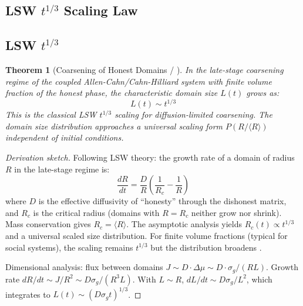 \documentclass[12pt,a4paper]{article}
\theoremstyle{plain}
\newtheorem{theorem}{ Theorem}[section]
\theoremstyle{definition}
\begin{document}
\subsection{LSW $t^{1/3}$ Scaling Law}
\subsection*{LSW $t^{1/3}$ }

\begin{theorem}[Coarsening of Honest Domains / ]
\label{thm:coarsening}
In the late-stage coarsening regime of the coupled Allen-Cahn/Cahn-Hilliard
system with finite volume fraction of the honest phase, the characteristic
domain size $L(t)$ grows as:
\begin{equation}
    L(t) \sim t^{1/3}
    \label{eq:lsw_scaling}
\end{equation}
This is the classical LSW $t^{1/3}$ scaling for diffusion-limited coarsening.
The domain size distribution approaches a universal scaling form
$P(R/\langle R\rangle)$ independent of initial conditions.
\end{theorem}

\begin{proof}[Derivation sketch]
Following LSW theory: the growth rate of a domain of radius $R$ in the
late-stage regime is:
\begin{equation}
    \frac{dR}{dt} = \frac{D}{R}\left(\frac{1}{R_c} - \frac{1}{R}\right)
    \label{eq:lsw_growth}
\end{equation}
where $D$ is the effective diffusivity of ``honesty'' through the dishonest
matrix, and $R_c$ is the critical radius (domains with $R=R_c$ neither
grow nor shrink). Mass conservation gives $R_c = \langle R\rangle$.
The asymptotic analysis yields $R_c(t) \propto t^{1/3}$ and a universal
scaled size distribution. For finite volume fractions (typical for social
systems), the scaling remains $t^{1/3}$ but the distribution broadens
\cite{ardell1972}.

Dimensional analysis: flux between domains $J \sim D\cdot\Delta\mu \sim D\cdot\sigma_g/(RL)$.
Growth rate $dR/dt \sim J/R^2 \sim D\sigma_g/(R^3L)$. With $L\sim R$,
$dL/dt \sim D\sigma_g/L^2$, which integrates to $L(t) \sim (D\sigma_g t)^{1/3}$.
\end{proof}
\end{document}
